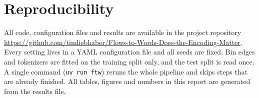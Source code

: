 \section*{Reproducibility}
All code, configuration files and results are available in the project repository
\url{https://github.com/timliebhaber/Flows-to-Words-Does-the-Encoding-Matter}. Every setting lives in a YAML configuration file and all seeds
are fixed. Bin edges and tokenizers are fitted on the training split only, and the test split is read once. A single
command (\texttt{uv run ftw}) reruns the whole pipeline and skips steps that are already finished. All tables, figures
and numbers in this report are generated from the results file.
